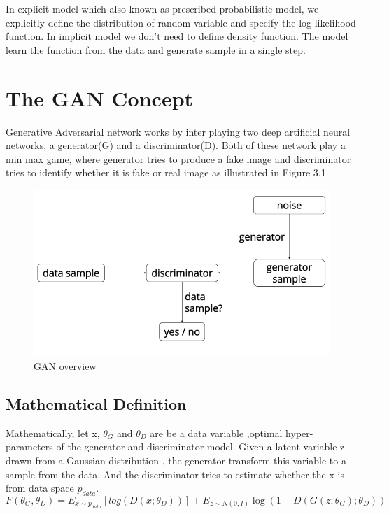 In explicit model which also known as prescribed probabilistic model, we explicitly define the distribution of random variable and specify the log likelihood function.
In implicit model we don't need to define density function\cite{1}. The model learn the function from the data and generate sample in a single step.

\section{The GAN  Concept}
Generative Adversarial network works by inter playing two deep artificial neural networks, a generator(G) and a discriminator(D). Both of these network play a min max game, where generator tries to produce a fake image and discriminator tries to identify whether it is fake or real image as illustrated in Figure 3.1 
\begin{figure}[t]

  \centering
    \includegraphics[scale=.4, angle=0]{Files/gan-overview.png}
    \caption[GAN overview]{ GAN overview\cite{Gan-overview}}
    \label{fig: GAN-Overview}
\end{figure}
\newpage
\subsection{Mathematical Definition}
Mathematically, let x,  $\theta_{G}$  and $\theta_{D}$ are be a data variable ,optimal hyper-parameters of the generator and discriminator model. Given a latent variable z drawn from a Gaussian distribution  , the generator transform this variable to a sample from the data. And the discriminator tries to estimate whether the x is from data space $p_{data}$.
$$ F (\theta_{G}, \theta_{D}) = E_{x\sim p_{data}} [log (D (x; \theta_{D}))] + E_{z\sim N(0,I)}\log (1- D(G (z; \theta_{G}) ; \theta_{D}))$$
